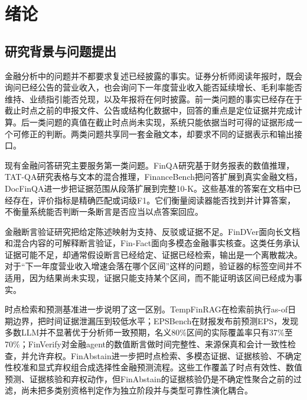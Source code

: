 \chapter{绪论}
\label{ch:intro}

\section{研究背景与问题提出}

金融分析中的问题并不都要求复述已经披露的事实。证券分析师阅读年报时，既会询问已经公告的营业收入，也会询问下一年度营业收入能否延续增长、毛利率能否维持、业绩指引能否兑现，以及年报将在何时披露。前一类问题的事实已经存在于截止时点之前的申报文件、公告或结构化数据中，回答的重点是定位证据并完成计算。后一类问题的真值在截止时点尚未实现，系统只能依据当时可得的证据形成一个可修正的判断。两类问题共享同一套金融文本，却要求不同的证据表示和输出接口。

现有金融问答研究主要服务第一类问题。FinQA研究基于财务报表的数值推理\citep{chen2021finqa}，TAT-QA研究表格与文本的混合推理\citep{zhu2021tatqa}，FinanceBench把问答扩展到真实金融文档\citep{islam2023financebench}，DocFinQA进一步把证据范围从段落扩展到完整10-K\citep{reddy2024docfinqa}。这些基准的答案在文档中已经存在，评价指标是精确匹配或词级F1。它们衡量阅读器能否找到并计算答案，不衡量系统能否判断一条断言是否应当以点答案回应。

金融断言验证研究把给定陈述映射为支持、反驳或证据不足。FinDVer面向长文档和混合内容的可解释断言验证\citep{zhao2024findver}，Fin-Fact面向多模态金融事实核查\citep{rangapur2025finfact}。这类任务承认证据可能不足，却通常假设断言已经给定、证据已经检索，输出是一个离散裁决。对于“下一年度营业收入增速会落在哪个区间”这样的问题，验证器的标签空间并不适用，因为结果尚未实现，证据只能支持某个区间，而不能证明该区间已经成为事实。\par
时点检索和预测基准进一步说明了这一区别。TempFinRAG在检索前执行as-of日期边界，把时间证据泄漏压到较低水平\citep{tao2026tempfinrag}；EPSBench在财报发布前预测EPS，发现多数LLM并不显著优于分析师一致预期，名义80\%区间的实际覆盖率只有37\%至70\%\citep{yin2026epsbench}；FinVerify对金融agent的数值断言做时间完整性、来源保真和会计一致性检查，并允许弃权\citep{guan2026finverify}。FinAbstain进一步把时点检索、多模态证据、证据核验、不确定性校准和显式弃权组合成选择性金融预测流程\citep{torres2026finabstain}。这些工作覆盖了时点有效性、数值预测、证据核验和弃权动作，但FinAbstain的证据核验仍是不确定性聚合之前的过滤，尚未把多类别资格判定作为独立阶段并与类型可靠性演化耦合。

